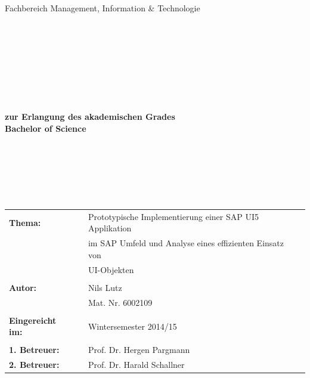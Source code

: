 \begin{center}
\Large{Fachbereich Management, Information \& Technologie}
\end{center}
\begin{verbatim}




\end{verbatim}
\begin{center}
\doublespacing
\textbf{\LARGE{\titleDocument}}\\
\singlespacing
\begin{verbatim}

\end{verbatim}
\end{center}
\begin{verbatim}

\end{verbatim}
\begin{center}

\end{center}
\begin{verbatim}

\end{verbatim}
\begin{center}
\textbf{zur Erlangung des akademischen Grades \\ Bachelor of Science}
\end{center}
\begin{verbatim}






\end{verbatim}
\begin{flushleft}
\begin{tabular}{llll}
\textbf{Thema:} & & Prototypische Implementierung einer SAP UI5 Applikation & \\
& & im SAP Umfeld und Analyse eines effizienten Einsatz von & \\
& & UI-Objekten & \\
& & & \\
\textbf{Autor:} & & Nils Lutz& \\
& & Mat. Nr. 6002109 & \\
& & & \\
\textbf{Eingereicht im:} & & Wintersemester 2014/15 &\\
& & & \\
\textbf{1. Betreuer:} & & Prof. Dr. Hergen Pargmann &\\
\textbf{2. Betreuer:} & & Prof. Dr. Harald Schallner &\\
\end{tabular}
\end{flushleft}